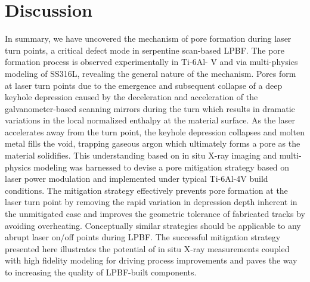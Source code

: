 \documentclass[10pt]{article}
\begin{document}
\section*{Discussion}
In summary, we have uncovered the mechanism of pore formation during laser turn points, a critical defect mode in serpentine scan-based LPBF. The pore formation process is observed experimentally in Ti-6Al- $\mathrm{V}$ and via multi-physics modeling of SS316L, revealing the general nature of the mechanism. Pores form at laser turn points due to the emergence and subsequent collapse of a deep keyhole depression caused by the deceleration and acceleration of the galvanometer-based scanning mirrors during the turn which results in dramatic variations in the local normalized enthalpy at the material surface. As the laser accelerates away from the turn point, the keyhole depression collapses and molten metal fills the void, trapping gaseous argon which ultimately forms a pore as the material solidifies. This understanding based on in situ X-ray imaging and multi-physics modeling was harnessed to devise a pore mitigation strategy based on laser power modulation and implemented under typical Ti-6Al-4V build conditions. The mitigation strategy effectively prevents pore formation at the laser turn point by removing the rapid variation in depression depth inherent in the unmitigated case and improves the geometric tolerance of fabricated tracks by avoiding overheating. Conceptually similar strategies should be applicable to any abrupt laser on/off points during LPBF. The successful mitigation strategy presented here illustrates the potential of in situ X-ray measurements coupled with high fidelity modeling for driving process improvements and paves the way to increasing the quality of LPBF-built components.
\end{document}
